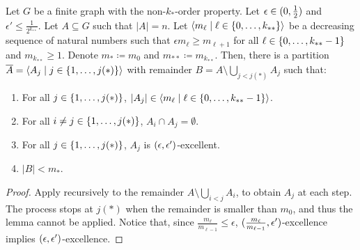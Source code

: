         \begin{lemma}[Claim 5.14.1] \label{lem:existance_of_excellent_partition}
            Let $G$ be a finite graph with the non-$k_{*}$-order property.
            Let $\epsilon \in ( 0, \frac{1}{2} )$ and $\epsilon' \leq \frac{1}{2^{k_{**}}}$.
            Let $A \subseteq G$ such that $|A| = n$.
            Let $\left< m_\ell \mid \ell \in \{ 0, \dots, k_{**} \} \right>$ be a decreasing sequence of natural numbers such that
            $\epsilon m_{\ell} \geq m_{\ell+1}$ for all $\ell \in \{ 0, \dots, k_{**}-1 \}$ and $m_{k_{**}} \geq 1$.
            Denote $m_* \coloneqq m_0$ and $m_{**} \coloneqq m_{k_{**}}$.
            Then, there is a partition $\overline{A} = \left< A_j \mid j \in \{ 1, \dots, j(*) \} \right>$ with remainder
            $B = A \setminus \bigcup_{j < j(*)} A_j$ such that:
            \begin{enumerate}[label=(\alph*), ref=\alph*]
                \item \label{itm:existance_of_excellent_partition.a} For all $j \in \{ 1, \dots, j(*) \}$, $|A_j| \in \left< m_\ell \mid \ell \in \{ 0, \dots, k_{**}-1 \} \right>$.
                \item \label{itm:existance_of_excellent_partition.b} For all $i \neq j \in \{ 1, \dots, j(*) \}$, $A_i \cap A_j = \emptyset$.
                \item \label{itm:existance_of_excellent_partition.c} For all $j \in \{ 1, \dots, j(*) \}$, $A_j$ is $( \epsilon, \epsilon' )$-excellent.
                \item \label{itm:existance_of_excellent_partition.d} $|B| < m_*$.
            \end{enumerate}
            \begin{proof}
                Apply  recursively to the remainder
                $A \setminus \bigcup_{i < j} A_i$, to obtain $A_j$ at each step.
                The process stops at $j(*)$ when the remainder is smaller than $m_0$, and thus the lemma cannot be applied.
                Notice that, since $\frac{m_\ell}{m_{\ell-1}} \leq \epsilon$, $( \frac{m_\ell}{m_{\ell-1}}, \epsilon' )$-excellence
                implies $( \epsilon, \epsilon' )$-excellence.
            \end{proof}
        \end{lemma}


